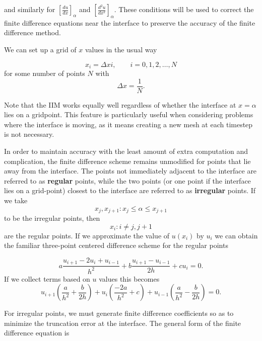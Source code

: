 and similarly for $[\frac{du}{dx}]_\alpha$ and $[\frac{d^2u}{dx^2}]_\alpha$.
These conditions will be used to correct the finite difference equations near the interface to preserve the accuracy of the finite difference method.

We can set up a grid of $x$ values in the usual way

\begin{equation}
    x_i = \Delta xi, \qquad i=0,1,2,\ldots,N \nonumber
\end{equation}
for some number of points $N$ with 
\begin{equation}
    \Delta x = \frac{1}{N} \nonumber.
\end{equation}

Note that the IIM works equally well regardless of whether the interface at $x = \alpha$ lies on a gridpoint.
This feature is particularly useful when considering problems where the interface is moving, as it means creating a new mesh at each timestep is not necessary.

In order to maintain accuracy with the least amount of extra computation and complication, the finite difference scheme remains unmodified for points that lie away from the interface.
The points not immediately adjacent to the interface are referred to as {\bf regular} points, while the two points (or one point if the interface lies on a grid-point) closest to the interface are referred to as {\bf irregular} points.
If we take 
\begin{equation}
    x_j, x_{j+1} : x_j \leq \alpha \leq x_{j+1} \nonumber
\end{equation}
to be the irregular points, then 
\begin{equation}
    x_i : i \neq j, j+1
\end{equation}
are the regular points.
If we approximate the value of $u(x_i)$ by $u_i$ we can obtain the familiar three-point centered difference scheme for the regular points

\begin{equation}
    a\frac{u_{i+1} - 2u_i +u_{i-1}}{h^2} + b\frac{u_{i+1} - u_{i-1}}{2h} + cu_i = 0.
\end{equation}
If we collect terms based on $u$ values this becomes
\begin{equation}
    u_{i+1}\left(\frac{a}{h^2} + \frac{b}{2h}\right) + u_i\left(\frac{-2a}{h^2} + c\right) + u_{i-1}\left(\frac{a}{h^2} - \frac{b}{2h}\right) = 0.
\end{equation}

For irregular points, we must generate finite difference coefficients so as to minimize the truncation error at the interface.
The general form of the finite difference equation is

